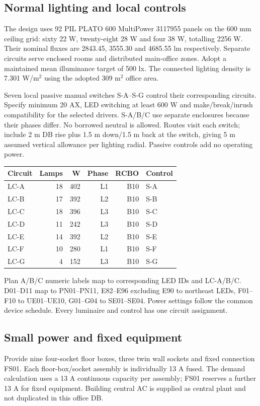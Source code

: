 {\fontsize{12}{14}\selectfont\tenantselection}
\subsection*{Normal lighting and local controls}
The design uses 92 PIL PLATO 600 MultiPower 3117955 panels on the 600 mm ceiling grid: sixty 22 W, twenty-eight 28 W and four 38 W, totalling 2256 W. Their nominal fluxes are 2843.45, 3555.30 and 4685.55 lm respectively. Separate circuits serve enclosed rooms and distributed main-office zones. Adopt a maintained mean illuminance target of 500 lx. The connected lighting density is 7.301 W/m$^2$ using the adopted 309 m$^2$ office area.

Seven local passive manual switches S-A--S-G control their corresponding circuits. Specify minimum 20 AX, LED switching at least 600 W and make/break/inrush compatibility for the selected drivers. S-A/B/C use separate enclosures because their phases differ. No borrowed neutral is allowed. Routes visit each switch;  include 2 m DB rise plus 1.5 m down/1.5 m back at the switch, giving 5 m assumed vertical allowance per lighting radial. Passive controls add no operating power.
\begin{center}\begin{tabular}{lrrrrl}\toprule
Circuit & Lamps & W & Phase & RCBO & Control\\\midrule

LC-A & 18 & 402 & L1 & B10 & S-A \\
LC-B & 17 & 392 & L2 & B10 & S-B \\
LC-C & 18 & 396 & L3 & B10 & S-C \\
LC-D & 11 & 242 & L3 & B10 & S-D \\
LC-E & 14 & 392 & L2 & B10 & S-E \\
LC-F & 10 & 280 & L1 & B10 & S-F \\
LC-G & 4 & 152 & L3 & B10 & S-G \\

\bottomrule\end{tabular}\end{center}
Plan A/B/C numeric labels map to corresponding LED IDs and LC-A/B/C. D01--D11 map to PN01--PN11, E82--E96 excluding E90 to northeast LEDs, F01--F10 to UE01--UE10, G01--G04 to SE01--SE04. Power settings follow the common device schedule. Every luminaire and control has one circuit assignment.

\subsection*{Small power and fixed equipment}
Provide nine four-socket floor boxes, three twin wall sockets and fixed connection FS01. Each floor-box/socket assembly is individually 13 A fused. The demand calculation uses a 13 A continuous capacity per assembly; FS01 reserves a further 13 A for fixed equipment. Building central AC is supplied as central plant and not duplicated in this office DB.

